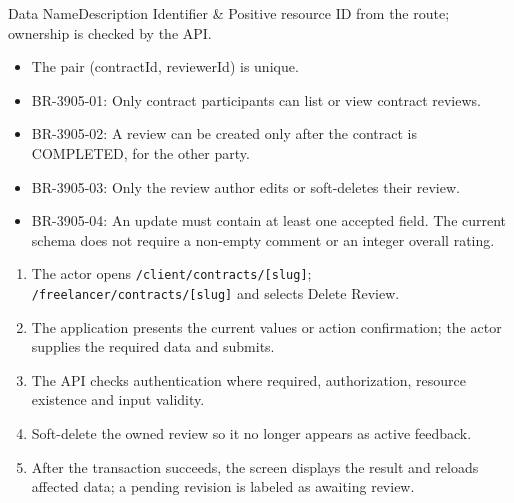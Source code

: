 
\begin{specdatatable}{Data Name}{Description}
Identifier & Positive resource ID from the route; ownership is checked by the API.\\ \hline
\end{specdatatable}

\begin{itemize}[leftmargin=1.6em,topsep=3pt,itemsep=2pt,parsep=0pt,label=$\bullet$]
    \item The pair (contractId, reviewerId) is unique.
\end{itemize}

\begin{itemize}[leftmargin=1.6em,topsep=3pt,itemsep=2pt,parsep=0pt,label=$\bullet$]\brrulelist
    \item BR-3905-01: Only contract participants can list or view contract reviews.
    \item BR-3905-02: A review can be created only after the contract is COMPLETED, for the other party.
    \item BR-3905-03: Only the review author edits or soft-deletes their review.
    \item BR-3905-04: An update must contain at least one accepted field. The current schema does not require a non-empty comment or an integer overall rating.
\end{itemize}

\begin{enumerate}[leftmargin=1.8em,topsep=3pt,itemsep=2pt,parsep=0pt]
    \item The actor opens \texttt{/\allowbreak{}client/\allowbreak{}contracts/\allowbreak{}[slug]}; \texttt{/\allowbreak{}freelancer/\allowbreak{}contracts/\allowbreak{}[slug]} and selects Delete Review.
    \item The application presents the current values or action confirmation; the actor supplies the required data and submits.
    \item The API checks authentication where required, authorization, resource existence and input validity.
    \item Soft-delete the owned review so it no longer appears as active feedback.
    \item After the transaction succeeds, the screen displays the result and reloads affected data; a pending revision is labeled as awaiting review.
\end{enumerate}


